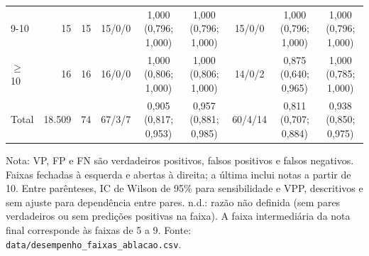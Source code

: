 \begin{table}[htbp]
\begin{tabular}{@{}lrrcccccc@{}}
9-10 & 15 & 15 & 15/0/0 & \shortstack{1,000\\(0,796; 1,000)} & \shortstack{1,000\\(0,796; 1,000)} & 15/0/0 & \shortstack{1,000\\(0,796; 1,000)} & \shortstack{1,000\\(0,796; 1,000)} \\
$\geq$10 & 16 & 16 & 16/0/0 & \shortstack{1,000\\(0,806; 1,000)} & \shortstack{1,000\\(0,806; 1,000)} & 14/0/2 & \shortstack{0,875\\(0,640; 0,965)} & \shortstack{1,000\\(0,785; 1,000)} \\
\midrule
Total & 18.509 & 74 & 67/3/7 & \shortstack{0,905\\(0,817; 0,953)} & \shortstack{0,957\\(0,881; 0,985)} & 60/4/14 & \shortstack{0,811\\(0,707; 0,884)} & \shortstack{0,938\\(0,850; 0,975)} \\
\bottomrule
\end{tabular}

\vspace{2pt}
\par\footnotesize Nota: VP, FP e FN são verdadeiros positivos, falsos positivos e falsos negativos. Faixas fechadas à esquerda e abertas à direita; a última inclui notas a partir de 10. Entre parênteses, IC de Wilson de 95\% para sensibilidade e VPP, descritivos e sem ajuste para dependência entre pares. n.d.: razão não definida (sem pares verdadeiros ou sem predições positivas na faixa). A faixa intermediária da nota final corresponde às faixas de 5 a 9. Fonte: \texttt{data/desempenho\_faixas\_ablacao.csv}.
\end{table}
